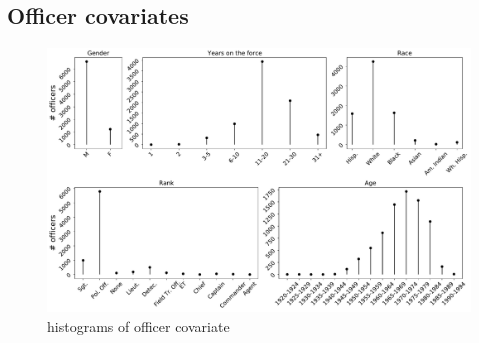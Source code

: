 


\subsection{Officer covariates}



\begin{figure}
\centering
\includegraphics[width=\textwidth]{figs/data_inspection.pdf}
\caption{histograms of officer covariate}\label{fig:histograms}
\end{figure}

